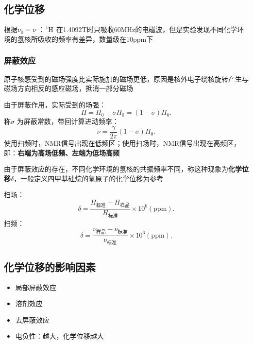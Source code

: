 \subsection{化学位移}%
\label{sub:化学位移}
根据$\nu_0=\nu$ ：$\ce{^1H}$ 在1.4092T时只吸收60MHz的电磁波，但是实验发现不同化学环境的氢核所吸收的频率有差异，数量级在10ppm下
\subsubsection*{屏蔽效应}%
\label{subsub*:屏蔽效应}
原子核感受到的磁场强度比实际施加的磁场更低，原因是核外电子绕核旋转产生与磁场方向相反的感应磁场，抵消一部分磁场

由于屏蔽作用，实际受到的场强：\[
    H = H_0-\sigma H_0 = \left( 1-\sigma \right)H_0
.\] 
称$\sigma$ 为屏蔽常数，带回计算进动频率：
\[
    \nu = \frac{\gamma}{2\pi }\left( 1-\sigma \right)H_0
.\]
使用扫频时，NMR信号出现在低频区；使用扫场时，NMR信号出现在高频区，即：\textbf{右端为高场低频、左端为低场高频}

\begin{notation}
    由于屏蔽效应的存在，不同化学环境的氢核的共振频率不同，称这种现象为\textbf{化学位移}$\delta$，一般定义四甲基硅烷的氢原子的化学位移为参考
\end{notation}
扫场：
\[
    \delta = \frac{H_\text{标准}-H_\text{样品}}{H_\text{标准}}\times 10^{6}\left( \text{ppm} \right)
.\]
扫频：
\[
    \delta = \frac{\nu_\text{样品}-\nu_\text{标准}}{\nu_\text{标准}}\times 10^{6}\left( \text{ppm} \right)
.\]
\subsection{化学位移的影响因素}%
\label{sub:化学位移的影响因素}
\begin{itemize}
    \item 局部屏蔽效应
    \item 溶剂效应
    \item 去屏蔽效应
    \item 电负性：越大，化学位移越大
\end{itemize}

